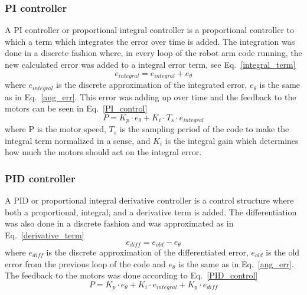 \subsubsection{PI controller}
\label{sec:simon8}
A PI controller or proportional integral controller is a proportional controller to which a term which integrates the error over time is added. The integration was done in a discrete fashion where, in every loop of the robot arm code running, the new calculated error was added to a integral error term, see Eq.~\eqref{integral_term}
\begin{equation}
    e_{integral} = e_{integral} + e_{\theta}
    \label{integral_term}
\end{equation}
where \(e_{integral}\) is the discrete approximation of the integrated error, \(e_{\theta}\) is the same as in Eq.~\eqref{ang_err}. This error was adding up over time and the feedback to the motors can be seen in Eq.~\eqref{PI_control}
\begin{equation}
    P = K_p\cdot e_{\theta} + K_i\cdot T_s\cdot e_{integral}
    \label{PI_control}
\end{equation}
where P is the motor speed, \(T_s\) is the sampling period of the code to make the integral term normalized in a sense, and \(K_i\) is the integral gain which determines how much the motors should act on the integral error.

\subsubsection{PID controller}
\label{sec:simon9}
A PID or proportional integral derivative controller is a control structure where both a proportional, integral, and a derivative term is added. The differentiation was also done in a discrete fashion and was approximated as in Eq.~\eqref{derivative_term}
\begin{equation}
    e_{diff} = e_{old} - e_{\theta}
    \label{derivative_term}
\end{equation}
where \(e_{diff}\) is the discrete approximation of the differentiated error, \(e_{old}\) is the old error from the previous loop of the code and \(e_{\theta}\) is the same as in Eq.~\eqref{ang_err}. The feedback to the motors was done according to Eq.~\eqref{PID_control}
\begin{equation}
    P = K_p\cdot e_{\theta} + K_i\cdot e_{integral} + K_p\cdot e_{diff}
    \label{PID_control}
\end{equation}
